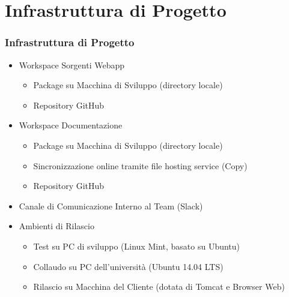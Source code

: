 \documentclass[a4paper,12pt]{beamer}
\begin{document}
\pagebreak

\section{Infrastruttura di Progetto}
\begin{frame}
\frametitle{Infrastruttura di Progetto}
\begin{itemize}
	\item Workspace Sorgenti Webapp
	\begin{itemize}
		\item Package su Macchina di Sviluppo (directory locale)
		\item Repository GitHub
	\end{itemize}
	\item Workspace Documentazione
	\begin{itemize}
		\item Package su Macchina di Sviluppo (directory locale)
		\item Sincronizzazione online tramite file hosting service (Copy)
		\item Repository GitHub
	\end{itemize}
	\item Canale di Comunicazione Interno al Team (Slack)
	\item Ambienti di Rilascio
	\begin{itemize}
		\item Test su PC di sviluppo (Linux Mint, basato su Ubuntu)
		\item Collaudo su PC dell'università (Ubuntu 14.04 LTS)
		\item Rilascio su Macchina del Cliente (dotata di Tomcat e Browser Web)
	\end{itemize}
\end{itemize}
\end{frame}



\pagebreak
\end{document}
